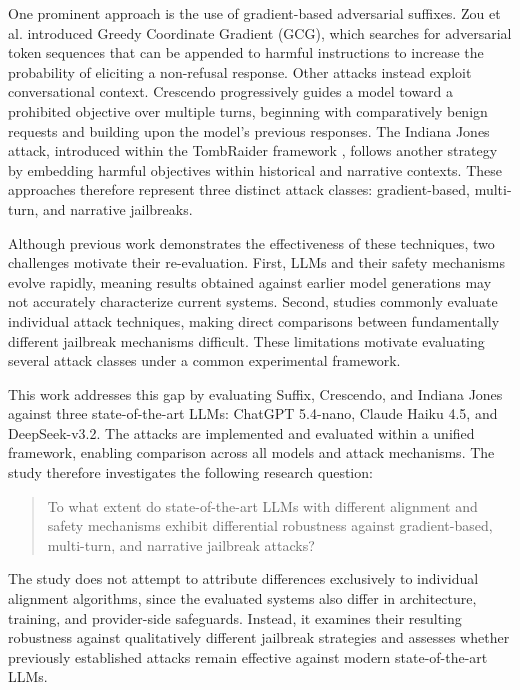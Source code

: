 \documentclass[11pt,a4paper,twocolumn]{article}
\begin{document}
	One prominent approach is the use of gradient-based adversarial suffixes.
	Zou et al. \cite{zou2023universaltransferableadversarialattacks} introduced Greedy Coordinate Gradient (GCG), which searches for adversarial token sequences that can be appended to harmful instructions to increase the probability of eliciting a non-refusal response.
	Other attacks instead exploit conversational context.
	Crescendo \cite{russinovich2025greatwritearticlethat} progressively guides a model toward a prohibited objective over multiple turns, beginning with comparatively benign requests and building upon the model's previous responses.
	The Indiana Jones attack, introduced within the TombRaider framework \cite{ding2025tombraiderenteringvaulthistory}, follows another strategy by embedding harmful objectives within historical and narrative contexts.
	These approaches therefore represent three distinct attack classes: gradient-based, multi-turn, and narrative jailbreaks.
	
	Although previous work demonstrates the effectiveness of these techniques, two challenges motivate their re-evaluation.
	First, LLMs and their safety mechanisms evolve rapidly, meaning results obtained against earlier model generations may not accurately characterize current systems.
	Second, studies commonly evaluate individual attack techniques, making direct comparisons between fundamentally different jailbreak mechanisms difficult.
	These limitations motivate evaluating several attack classes under a common experimental framework.
	
	This work addresses this gap by evaluating Suffix, Crescendo, and Indiana Jones against three state-of-the-art LLMs: ChatGPT 5.4-nano, Claude Haiku 4.5, and DeepSeek-v3.2.
	The attacks are implemented and evaluated within a unified framework, enabling comparison across all models and attack mechanisms.
	The study therefore investigates the following research question:
	
	\begin{quote}
		To what extent do state-of-the-art LLMs with different alignment and safety mechanisms exhibit differential robustness against gradient-based, multi-turn, and narrative jailbreak attacks?
	\end{quote}
	
	The study does not attempt to attribute differences exclusively to individual alignment algorithms, since the evaluated systems also differ in architecture, training, and provider-side safeguards.
	Instead, it examines their resulting robustness against qualitatively different jailbreak strategies and assesses whether previously established attacks remain effective against modern state-of-the-art LLMs.
	
\end{document}
